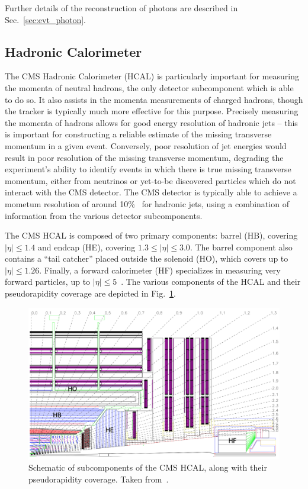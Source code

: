 Further details of the reconstruction of photons are described in Sec.~\ref{sec:evt_photon}.

\subsection{Hadronic Calorimeter} \label{sec:cms_hcal}
The CMS Hadronic Calorimeter (HCAL) is particularly important for measuring the momenta of neutral hadrons, the only detector subcomponent which is able to do so.
It also assists in the momenta measurements of charged hadrons, though the tracker is typically much more effective for this purpose.
Precisely measuring the momenta of hadrons allows for good energy resolution of hadronic jets -- this is important for constructing a reliable estimate of the missing transverse momentum in a given event.
Conversely, poor resolution of jet energies would result in poor resolution of the missing transverse momentum, degrading the experiment's ability to identify events in which there is true missing transverse momentum, either from neutrinos or yet-to-be discovered particles which do not interact with the CMS detector.
The CMS detector is typically able to achieve a mometum resolution of around 10\%~\cite{Bayatian:2006nff} for hadronic jets, using a combination of information from the various detector subcomponents.

The CMS HCAL is composed of two primary components: barrel (HB), covering $|\eta| \leq 1.4$ and endcap (HE), covering $1.3 \leq |\eta| \leq 3.0$.
The barrel component also contains a ``tail catcher'' placed outside the solenoid (HO), which covers up to $|\eta| \leq 1.26$.
Finally, a forward calorimeter (HF) specializes in measuring very forward particles, up to $|\eta| \leq 5$~\cite{Bayatian:2006nff}.
The various components of the HCAL and their pseudorapidity coverage are depicted in Fig.~\ref{fig:cms_hcal_schematic}.

\begin{figure} [htbp!]
    \centering
    \includegraphics[width=0.7\linewidth]{figures/cms/hcal_schematic.png}
    \caption{Schematic of subcomponents of the CMS HCAL, along with their pseudorapidity coverage. Taken from~\cite{Chatrchyan:2008aa}.}
    \label{fig:cms_hcal_schematic}
\end{figure}

